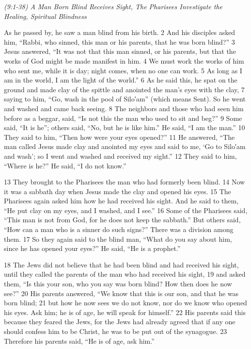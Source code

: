 \documentclass[letterpaper]{report}
\begin{document}
{\centering
	\emph{(9:1-38) A Man Born Blind Receives Sight,
		The Pharisees Investigate the Healing, Spiritual Blindness}\\
}
\begin{multicols}{2}
As he passed by, he saw a man blind from his birth. 2 And his disciples asked him, “Rabbi, who sinned, this man or his parents, that he was born blind?” 3 Jesus answered, “It was not that this man sinned, or his parents, but that the works of God might be made manifest in him. 4 We must work the works of him who sent me, while it is day; night comes, when no one can work. 5 As long as I am in the world, I am the light of the world.” 6 As he said this, he spat on the ground and made clay of the spittle and anointed the man’s eyes with the clay, 7 saying to him, “Go, wash in the pool of Silo′am” (which means Sent). So he went and washed and came back seeing. 8 The neighbors and those who had seen him before as a beggar, said, “Is not this the man who used to sit and beg?” 9 Some said, “It is he”; others said, “No, but he is like him.” He said, “I am the man.” 10 They said to him, “Then how were your eyes opened?” 11 He answered, “The man called Jesus made clay and anointed my eyes and said to me, ‘Go to Silo′am and wash’; so I went and washed and received my sight.” 12 They said to him, “Where is he?” He said, “I do not know.”

13 They brought to the Pharisees the man who had formerly been blind. 14 Now it was a sabbath day when Jesus made the clay and opened his eyes. 15 The Pharisees again asked him how he had received his sight. And he said to them, “He put clay on my eyes, and I washed, and I see.” 16 Some of the Pharisees said, “This man is not from God, for he does not keep the sabbath.” But others said, “How can a man who is a sinner do such signs?” There was a division among them. 17 So they again said to the blind man, “What do you say about him, since he has opened your eyes?” He said, “He is a prophet.”

18 The Jews did not believe that he had been blind and had received his sight, until they called the parents of the man who had received his sight, 19 and asked them, “Is this your son, who you say was born blind? How then does he now see?” 20 His parents answered, “We know that this is our son, and that he was born blind; 21 but how he now sees we do not know, nor do we know who opened his eyes. Ask him; he is of age, he will speak for himself.” 22 His parents said this because they feared the Jews, for the Jews had already agreed that if any one should confess him to be Christ, he was to be put out of the synagogue. 23 Therefore his parents said, “He is of age, ask him.”


\end{multicols}
\end{document}
